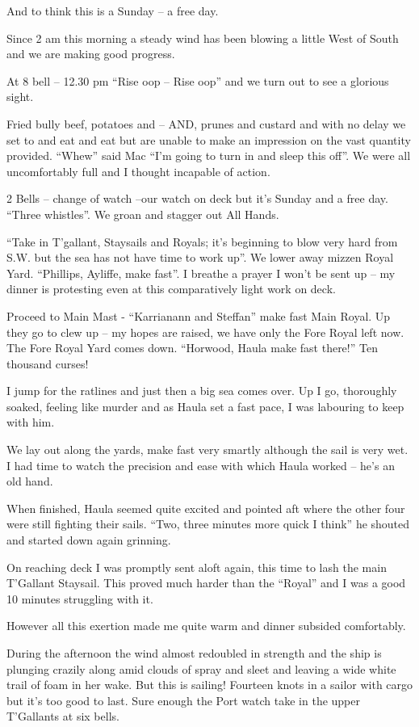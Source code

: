 \documentclass[
  11pt,
  msmallroyalvopaper
]{memoir}
\begin{document}
And to think this is a Sunday -- a free day.

Since 2 am this morning a steady wind has been blowing a little West of
South and we are making good progress.

At 8 bell -- 12.30 pm ``Rise oop -- Rise oop'' and we turn out to see a
glorious sight.

Fried bully beef, potatoes and -- AND, prunes and custard and with no
delay we set to and eat and eat but are unable to make an impression on
the vast quantity provided. ``Whew'' said Mac ``I'm going to turn in and
sleep this off''. We were all uncomfortably full and I thought incapable
of action.

2 Bells -- change of watch --our watch on deck but it's Sunday and a
free day. ``Three whistles''. We groan and stagger out All Hands.

``Take in T'gallant, Staysails and Royals; it's beginning to blow very
hard from S.W. but the sea has not have time to work up''. We lower away
mizzen Royal Yard. ``Phillips, Ayliffe, make fast''. I breathe a prayer
I won't be sent up -- my dinner is protesting even at this comparatively
light work on deck.

Proceed to Main Mast - ``Karrianann and Steffan'' make fast Main Royal.
Up they go to clew up -- my hopes are raised, we have only the Fore
Royal left now. The Fore Royal Yard comes down. ``Horwood, Haula make
fast there!'' Ten thousand curses!

I jump for the ratlines and just then a big sea comes over. Up I go,
thoroughly soaked, feeling like murder and as Haula set a fast pace, I
was labouring to keep with him.

We lay out along the yards, make fast very smartly although the sail is
very wet. I had time to watch the precision and ease with which Haula
worked -- he's an old hand.

When finished, Haula seemed quite excited and pointed aft where the
other four were still fighting their sails. ``Two, three minutes more
quick I think'' he shouted and started down again grinning.

On reaching deck I was promptly sent aloft again, this time to lash the
main T'Gallant Staysail. This proved much harder than the ``Royal'' and
I was a good 10 minutes struggling with it.

However all this exertion made me quite warm and dinner subsided
comfortably.

During the afternoon the wind almost redoubled in strength and the ship
is plunging crazily along amid clouds of spray and sleet and leaving a
wide white trail of foam in her wake. But this is sailing! Fourteen
knots in a sailor with cargo but it's too good to last. Sure enough the
Port watch take in the upper T'Gallants at six bells.
\end{document}
